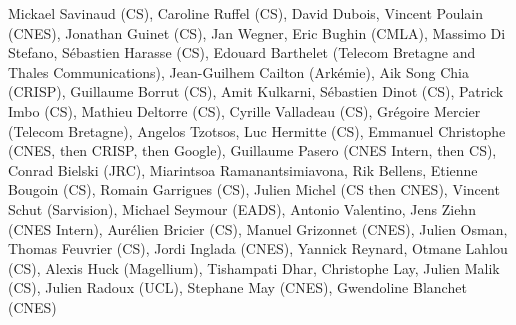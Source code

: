 Mickael Savinaud (CS), Caroline Ruffel (CS), David Dubois, Vincent Poulain (CNES), Jonathan Guinet (CS), Jan Wegner, Eric Bughin (CMLA), Massimo Di Stefano, S\'ebastien Harasse (CS), Edouard Barthelet (Telecom Bretagne and Thales Communications), Jean-Guilhem Cailton (Ark\'emie), Aik Song Chia (CRISP), Guillaume Borrut (CS), Amit Kulkarni, S\'ebastien Dinot (CS), Patrick Imbo (CS), Mathieu Deltorre (CS), Cyrille Valladeau (CS), Gr\'egoire Mercier (Telecom Bretagne), Angelos Tzotsos, Luc Hermitte (CS), Emmanuel Christophe (CNES, then CRISP, then Google), Guillaume Pasero (CNES Intern, then CS), Conrad Bielski (JRC), Miarintsoa Ramanantsimiavona, Rik Bellens, Etienne Bougoin (CS), Romain Garrigues (CS), Julien Michel (CS then CNES), Vincent Schut (Sarvision), Michael Seymour (EADS), Antonio Valentino, Jens Ziehn (CNES Intern), Aur\'elien Bricier (CS), Manuel Grizonnet (CNES), Julien Osman, Thomas Feuvrier (CS), Jordi Inglada (CNES), Yannick Reynard, Otmane Lahlou (CS), Alexis Huck (Magellium), Tishampati Dhar, Christophe Lay, Julien Malik (CS), Julien Radoux (UCL), Stephane May (CNES), Gwendoline Blanchet (CNES)